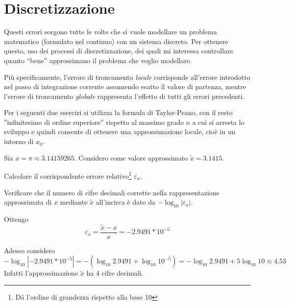 \section{Discretizzazione} 

Questi errori sorgono tutte le volte che si vuole modellare un problema 
matematico (formulato nel continuo) con un sistema discreto. Per ottenere 
questo, uso dei processi di discretizzazione, dei quali mi interessa controllare
quanto ``bene'' approssimano il problema che voglio modellare.

Pi\`u specificamente, l'errore di troncamento \emph{locale} corrisponde 
all'errore introdotto nel passo di integrazione corrente assumendo esatto il 
valore di partenza, mentre l'errore di troncamento \emph{globale} rappresenta 
l'effetto di tutti gli errori precedenti.

Per i seguenti due esercizi si utilizza la formula di Taylor-Peano, con il 
resto ''infinitesimo di ordine superiore'' rispetto al massimo grado $n$ a cui 
si arresta lo sviluppo e quindi consente di ottenere una approssimazione
locale, cio\`e in un intorno di $x_{0}$.

\begin{exercise}[1.1]
	Sia $x = \pi \approx 3.14159265$. Considero come valore approssimato 
	$\tilde{x} = 3.1415$. 
	
	Calcolare il corrispondente errore relativo\footnote{D\'a l'ordine di 
	grandezza rispetto alla base $10$} $\varepsilon_{x}$. 
	
	Verificare che il numero di cifre decimali corrette nella rappresentazione 
	approssimata di $x$ mediante $\tilde{x}$ all'incirca \`e dato da $-\log_{10}
	{|\varepsilon_{x}|}$.
\end{exercise}
Ottengo $$\varepsilon_{x} = \frac{\tilde{x}-x}{x} = -2.9491*10^{-5}$$

Adesso considero
\begin{equation*}
	-\log_{10}{|-2.9491*10^{-5}|} = -\left (\log_{10}{2.9491} +
	\log_{10}{10^{-5}} \right ) = -\log_{10}{2.9491} + 5\log_{10}{10} \approx 4.53
\end{equation*}
Infatti l'approssimazione $\tilde{x}$ ha 4 cifre decimali.


